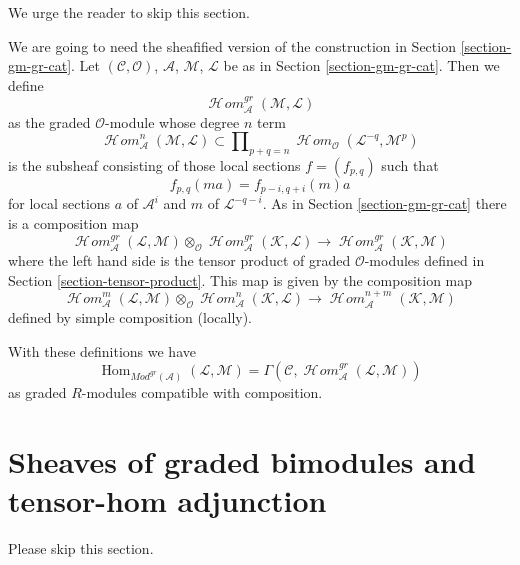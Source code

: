 \documentclass{stacks-project}
\theoremstyle{plain}
\theoremstyle{definition}
\theoremstyle{remark}
\numberwithin{equation}{subsection}
\def\Hom{\mathop{\mathrm{Hom}}\nolimits}
\def\SheafHom{\mathop{\mathcal{H}\!\mathit{om}}\nolimits}
\begin{document}
\noindent
We urge the reader to skip this section.

\medskip\noindent
We are going to need the sheafified version of the construction
in Section \ref{section-gm-gr-cat}.
Let $(\mathcal{C}, \mathcal{O})$, $\mathcal{A}$,
$\mathcal{M}$, $\mathcal{L}$ be as in Section \ref{section-gm-gr-cat}.
Then we define
$$
\SheafHom^{gr}_\mathcal{A}(\mathcal{M}, \mathcal{L})
$$
as the graded $\mathcal{O}$-module whose degree $n$ term
$$
\SheafHom^n_\mathcal{A}(\mathcal{M}, \mathcal{L})
\subset
\prod\nolimits_{p + q = n}
\SheafHom_\mathcal{O}(\mathcal{L}^{-q}, \mathcal{M}^p)
$$
is the subsheaf consisting of those local sections $f = (f_{p, q})$ such that
$$
f_{p, q}(m a) = f_{p - i, q + i}(m)a
$$
for local sections $a$ of $\mathcal{A}^i$ and
$m$ of $\mathcal{L}^{-q - i}$. As in Section \ref{section-gm-gr-cat}
there is a composition map
$$
\SheafHom^{gr}_\mathcal{A}(\mathcal{L}, \mathcal{M}) \otimes_\mathcal{O}
\SheafHom^{gr}_\mathcal{A}(\mathcal{K}, \mathcal{L})
\longrightarrow
\SheafHom^{gr}_\mathcal{A}(\mathcal{K}, \mathcal{M})
$$
where the left hand side is the tensor product of graded $\mathcal{O}$-modules
defined in Section \ref{section-tensor-product}.
This map is given by the composition map
$$
\SheafHom^m_\mathcal{A}(\mathcal{L}, \mathcal{M}) \otimes_\mathcal{O}
\SheafHom^n_\mathcal{A}(\mathcal{K}, \mathcal{L}) \longrightarrow
\SheafHom^{n + m}_\mathcal{A}(\mathcal{K}, \mathcal{M})
$$
defined by simple composition (locally).

\medskip\noindent
With these definitions we have
$$
\Hom_{\textit{Mod}^{gr}(\mathcal{A})}(\mathcal{L}, \mathcal{M}) =
\Gamma(\mathcal{C}, \SheafHom^{gr}_\mathcal{A}(\mathcal{L}, \mathcal{M}))
$$
as graded $R$-modules compatible with composition.







\section{Sheaves of graded bimodules and tensor-hom adjunction}
\label{section-graded-bimodules}

\noindent
Please skip this section.
\end{document}
